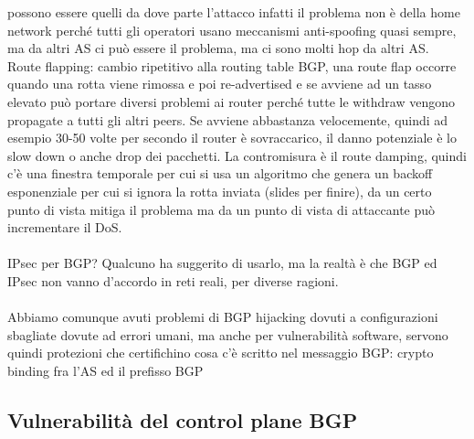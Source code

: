 \documentclass[12pt, oneside]{extbook} %
\begin{document}
possono essere quelli da dove parte l'attacco infatti il problema non è della home network perché tutti gli operatori usano meccanismi anti-spoofing quasi sempre, ma da altri AS ci può essere il problema, ma ci sono molti hop da altri AS.\\Route flapping: cambio ripetitivo alla routing table BGP, una route flap occorre quando una rotta viene rimossa e poi re-advertised e se avviene ad un tasso elevato può portare diversi problemi ai router perché tutte le withdraw vengono propagate a tutti gli altri peers. Se avviene abbastanza velocemente, quindi ad esempio 30-50 volte per secondo il router è sovraccarico, il danno potenziale è lo slow down o anche drop dei pacchetti. La contromisura è il route damping, quindi c'è una finestra temporale per cui si usa un algoritmo che genera un backoff esponenziale per cui si ignora la rotta inviata (slides per finire), da un certo punto di vista mitiga il problema ma da un punto di vista di attaccante può incrementare il DoS.\\\\IPsec per BGP? Qualcuno ha suggerito di usarlo, ma la realtà è che BGP ed IPsec non vanno d'accordo in reti reali, per diverse ragioni.\\\\Abbiamo comunque avuti problemi di BGP hijacking dovuti a configurazioni sbagliate dovute ad errori umani, ma anche per vulnerabilità software, servono quindi protezioni che certifichino cosa c'è scritto nel messaggio BGP: crypto binding fra l'AS ed il prefisso BGP
\subsection{Vulnerabilità del control plane BGP}
\end{document}
